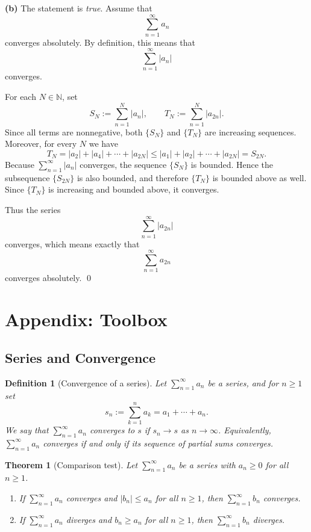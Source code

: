 \documentclass[12pt]{article}
\newtheorem{theorem}{Theorem}
\newtheorem{definition}{Definition}
\begin{document}
\textbf{(b)} The statement is \emph{true}. Assume that
\[
\sum_{n=1}^{\infty} a_n
\]
converges absolutely. By definition, this means that
\[
\sum_{n=1}^{\infty} |a_n|
\]
converges.

For each $N\in\mathbb{N}$, set
\[
S_N := \sum_{n=1}^{N} |a_n|,
\qquad
T_N := \sum_{n=1}^{N} |a_{2n}|.
\]
Since all terms are nonnegative, both $\{S_N\}$ and $\{T_N\}$ are increasing sequences. Moreover, for every $N$ we have
\[
T_N = |a_2|+|a_4|+\cdots+|a_{2N}| \le |a_1|+|a_2|+\cdots+|a_{2N}| = S_{2N}.
\]
Because $\sum_{n=1}^{\infty} |a_n|$ converges, the sequence $\{S_N\}$ is bounded. Hence the subsequence $\{S_{2N}\}$ is also bounded, and therefore $\{T_N\}$ is bounded above as well. Since $\{T_N\}$ is increasing and bounded above, it converges.

Thus the series
\[
\sum_{n=1}^{\infty} |a_{2n}|
\]
converges, which means exactly that
\[
\sum_{n=1}^{\infty} a_{2n}
\]
converges absolutely.
\qed

\newpage
\appendix
\section*{Appendix: Toolbox}

\subsection*{Series and Convergence}

\begin{definition}[Convergence of a series]
Let $\sum_{n=1}^{\infty} a_n$ be a series, and for $n\ge 1$ set
\[
s_n := \sum_{k=1}^{n} a_k = a_1+\cdots+a_n.
\]
We say that $\sum_{n=1}^{\infty} a_n$ converges to $s$ if $s_n\to s$ as
$n\to\infty$. Equivalently, $\sum_{n=1}^{\infty} a_n$ converges if and only if
its sequence of partial sums converges.
\end{definition}

\begin{theorem}[Comparison test]
Let $\sum_{n=1}^{\infty} a_n$ be a series with $a_n\ge 0$ for all $n\ge 1$.
\begin{enumerate}[label=\textbf{(\arabic*)}]
\item If $\sum_{n=1}^{\infty} a_n$ converges and $|b_n|\le a_n$ for all
      $n\ge 1$, then $\sum_{n=1}^{\infty} b_n$ converges.
\item If $\sum_{n=1}^{\infty} a_n$ diverges and $b_n\ge a_n$ for all $n\ge 1$,
      then $\sum_{n=1}^{\infty} b_n$ diverges.
\end{enumerate}
\end{theorem}
\end{document}
